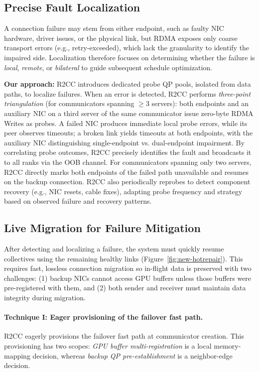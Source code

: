\documentclass[letterpaper,twocolumn,10pt]{article}
\begin{document}
\subsection{Precise Fault Localization}
A connection failure may stem from either endpoint, such as faulty NIC hardware, driver issues, or the physical link, but RDMA exposes only coarse transport errors (e.g., retry-exceeded), which lack the granularity to identify the impaired side. Localization therefore focuses on determining whether the failure is \textit{local}, \textit{remote}, or \textit{bilateral} to guide subsequent schedule optimization. 

\textbf{Our approach:}
R2CC introduces dedicated probe QP pools, isolated from data paths, to localize failures. When an error is detected, R2CC performs \textit{three-point triangulation} (for communicators spanning $\ge$3 servers): both endpoints and an auxiliary NIC on a third server of the same communicator issue zero-byte RDMA Writes as probes. A failed NIC produces immediate local probe errors, while its peer observes timeouts; a broken link yields timeouts at both endpoints, with the auxiliary NIC distinguishing single-endpoint vs. dual-endpoint impairment. By correlating probe outcomes, R2CC precisely identifies the fault and broadcasts it to all ranks via the OOB channel. For communicators spanning only two servers, R2CC directly marks both endpoints of the failed path unavailable and resumes on the backup connection. R2CC also periodically reprobes to detect component recovery (e.g., NIC resets, cable fixes), adapting probe frequency and strategy based on observed failure and recovery patterns.

\subsection{Live Migration for Failure Mitigation}
After detecting and localizing a failure, the system must quickly resume collectives using the remaining healthy links (Figure~\ref{fig:new-hotrepair}). This requires fast, lossless connection migration so in-flight data is preserved with two challenges: (1) backup NICs cannot access GPU buffers unless those buffers were pre-registered with them, and (2) both sender and receiver must maintain data integrity during migration.

\paragraph{Technique I: Eager provisioning of the failover fast path.} R2CC eagerly provisions the failover fast path at communicator creation. This provisioning has two scopes: \emph{GPU buffer multi-registration} is a local memory-mapping decision, whereas \emph{backup QP pre-establishment} is a neighbor-edge decision.
\end{document}
